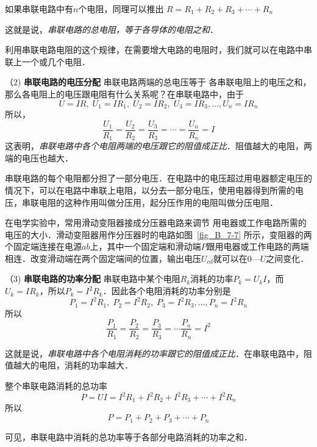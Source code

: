 如果串联电路中有$n$个电阻，同理可以推出
$R=R_1+R_2+R_3+\cdots+R_n$

这就是说，\textit{串联电路的总电阻，等于各导体的电阻之和}．

利用串联电路电阻的这个规律，在需要增大电路的电阻时，我们就可以在电路中串联上一个或几个电阻．

（2) \textbf{串联电路的电压分配 } 串联电路两端的总电压等于
各串联电阻上的电压之和，那么各电阻上的电压跟电阻有什么关系呢？在串联电路中，由于
\[U=IR,\;  U_1=IR_1,\; U_2=IR_2,\; U_3=IR_3,\ldots, U_n=IR_n\]
所以，
\[\frac{U_1}{R_1}=\frac{U_2}{R_2}=\frac{U_3}{R_3}=\cdots=\frac{U_n}{R_n}=I \]
这表明，\textit{串联电路中各个电阻两端的电压跟它的阻值成正比}．阻值越大的电阻，两端的电压也越大．

串联电路的每个电阻都分担了一部分电压．在电路中的电压超过用电器额定电压的情况下，可以在电路中串联上电阻，以分去一部分电压，使用电器得到所需的电压，串联电阻的这种作用叫做分压用，起分压作用的电阻叫做分压电阻．

在电学实验中，常用滑动变阻器接成分压器电路来调节
用电器或工作电路所需的电压的大小．滑动变阻器用作分压器时的电路如图~\ref{fig_B_7-7} 所示，变阻器的两个固定端连接在电源$ab$上，其中一个固定端和滑动端$P$跟用电器或工作电路的两端相连．改变滑动端在两个固定端间的位置，输出电压$U_{cd}$就可以在0—$U$之间变化．

（3) \textbf{串联电路的功率分配 } 串联电路中某个电阻$R_k$消耗的功率$P_k=U_kI$，而$U_k=IR_k$，所以$P_k=I^2R_k$．因此各个电阻消耗的功率分别是
\[P_1=I^2R_1,\; P_2=I^2R_2,\; P_3=I^2R_3,\ldots, P_n=I^2R_n\]
所以
\[\frac{P_1}{R_1}=\frac{P_2}{R_2}=\frac{P_3}{R_3}=\cdots\frac{P_n}{R_n}=I^2 \]

这就是说，\textit{串联电路中各个电阻消耗的功率跟它的阻值成正比}．在串联电路中，阻值越大的电阻，消耗的功率越大．

整个串联电路消耗的总功率
\[P=UI=I^2R_1 +I^2R_2+I^2R_3+\cdots+I^2R_n
\]
所以
\[P=P_1+P_2+P_3+\cdots +P_n\]

可见，串联电路中消耗的总功率等于各部分电路消耗的功率之和．

